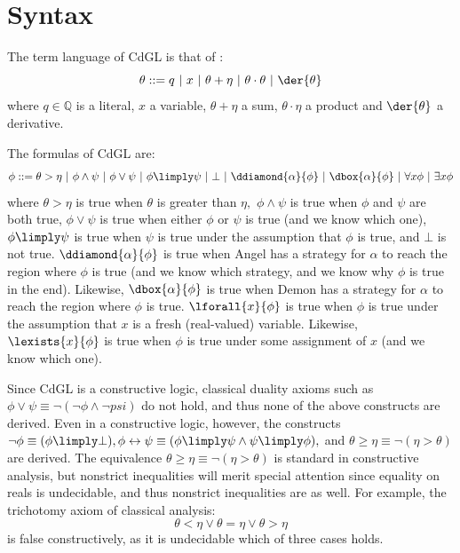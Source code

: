 \documentclass[12pt]{cmuthesis}
\theoremstyle{definition}
\theoremstyle{remark}
\newcommand{\bebecomes}{\mathrel{::=}}
\newcommand{\alternative}{~|~}
\newcommand{\lequiv}{\leftrightarrow}
\newcommand{\CdGL}{\textsf{CdGL}\xspace}
\begin{document}
\section{Syntax}
The term language of \CdGL is that of \dL:
\[\theta \bebecomes  q \alternative x \alternative \theta + \eta \alternative \theta \cdot \theta \alternative \der{\theta}\]
where $q \in \mathbb{Q}$ is a literal, $x$ a variable, $\theta + \eta$ a sum, $\theta \cdot \eta$ a product and $\der{\theta}$ a derivative.

The formulas of \CdGL are:
\[\phi \bebecomes \theta > \eta \alternative  \phi \land \psi \alternative \phi \lor \psi \alternative \phi \limply \psi \alternative \bot \alternative \ddiamond{\alpha}{\phi} \alternative \dbox{\alpha}{\phi} \alternative \forall{x}{\phi} \alternative \exists{x}{\phi}\]
where $\theta > \eta$ is true when $\theta$ is greater than $\eta,$ $\phi \land \psi$ is true when $\phi$ and $\psi$ are both true, $\phi \lor \psi$ is true when either $\phi$ or $\psi$ is true (and we know which one), $\phi \limply \psi$ is true when $\psi$ is true under the assumption that $\phi$ is true, and $\bot$ is not true.
$\ddiamond{\alpha}{\phi}$ is true when Angel has a strategy for $\alpha$ to reach the region where $\phi$ is true (and we know which strategy, and we know why $\phi$ is true in the end).
Likewise, $\dbox{\alpha}{\phi}$ is true when Demon has a strategy for $\alpha$ to reach the region where $\phi$ is true.
$\lforall{x}{\phi}$ is true when $\phi$ is true under the assumption that $x$ is a fresh (real-valued) variable.
Likewise, $\lexists{x}{\phi}$ is true when $\phi$ is true under some assignment of $x$ (and we know which one).

Since \CdGL is a constructive logic, classical duality axioms such as $\phi \lor \psi \equiv \neg(\neg \phi \land \neg psi)$ do not hold, and thus none of the above constructs are derived.
Even in a constructive logic, however, the constructs $\neg \phi \equiv (\phi \limply \bot), \phi \lequiv \psi \equiv (\phi \limply \psi \land \psi \limply \phi),$ and $\theta \geq \eta \equiv \neg(\eta > \theta)$ are derived.
The equivalence $\theta \geq \eta \equiv \neg(\eta > \theta)$ is standard in constructive analysis, but nonstrict inequalities will merit special attention since equality on reals is undecidable, and thus nonstrict inequalities are as well.
For example, the trichotomy axiom of classical analysis:
\[\theta < \eta \lor \theta = \eta \lor \theta > \eta\]
is false constructively, as it is undecidable which of three cases holds.
\end{document}
